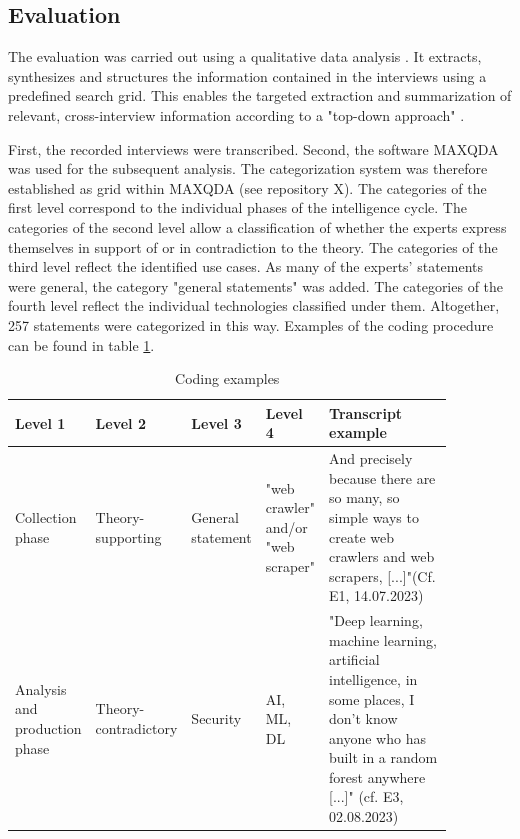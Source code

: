 \documentclass[10pt]{article}
\begin{document}
\subsection{Evaluation}

The evaluation was carried out using a qualitative data analysis \cite{Glaser.2009}.
It extracts, synthesizes and structures the information contained in the interviews
using a predefined search grid. This enables the targeted
extraction and summarization of relevant, cross-interview information
according to a "top-down approach" \cite{Bogner.2014, Glaser.2009}.

First, the recorded interviews were transcribed. Second, the software
MAXQDA was used for the subsequent analysis.
The categorization system was therefore established as grid within MAXQDA
(see repository X). The categories of the first level correspond to
the individual phases of the intelligence cycle. The categories of the
second level allow a classification of whether the experts express
themselves in support of or in contradiction to the theory. The
categories of the third level reflect the identified use cases.
As many of the experts' statements were general, the
category "general statements" was added. The categories
of the fourth level reflect the individual technologies classified
under them. Altogether, 257 statements were categorized in this way. Examples of the coding
procedure can be found in table \ref{tab:coding}.

\begin{table}[htbp]
    \caption{Coding examples}
    \label{tab:coding}
    \begin{tabular*}{\textwidth}{|p{0.12\linewidth}|p{0.12\linewidth}|p{0.12\linewidth}|p{0.12\linewidth}|p{0.39\linewidth}|}
        \hline
        \textbf{Level 1} & \textbf{Level 2} & \textbf{Level 3} & \textbf{Level 4} & \textbf{Transcript example} \\
        \hline
        Collection phase & Theory- supporting & General statement & "web crawler" and/or "web scraper" & And precisely because there are so many, so simple ways to create web crawlers and web scrapers, [...]"(Cf. E1, 14.07.2023) \\
        \hline
        Analysis and production phase & Theory- contradictory & Security & AI, ML, DL & "Deep learning, machine learning, artificial intelligence, in some places, I don't know anyone who has built in a random forest anywhere [...]" (cf. E3, 02.08.2023) \\
        \hline
    \end{tabular*}
\end{table}
\end{document}
